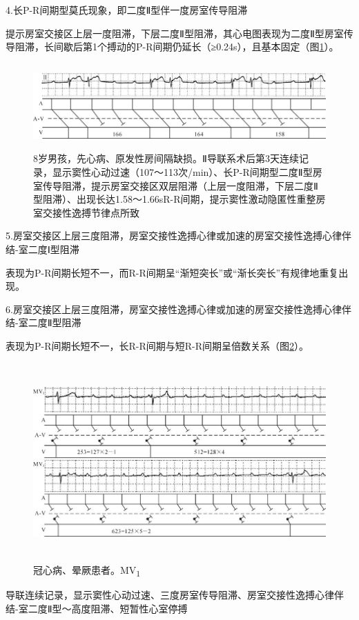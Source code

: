 4.长P-R间期型莫氏现象，即二度Ⅱ型伴一度房室传导阻滞

提示房室交接区上层一度阻滞，下层二度Ⅱ型阻滞，其心电图表现为二度Ⅱ型房室传导阻滞，长间歇后第1个搏动的P-R间期仍延长（≥0.24s），且基本固定（图\ref{fig24-5}）。

\begin{figure}[!htbp]
 \centering
 \includegraphics[width=5.76042in,height=1.29167in]{./images/Image00400.jpg}
 \captionsetup{justification=centering}
 \caption{8岁男孩，先心病、原发性房间隔缺损。Ⅱ导联系术后第3天连续记录，显示窦性心动过速（107～113次/min）、长P-R间期型二度Ⅱ型房室传导阻滞，提示房室交接区双层阻滞（上层一度阻滞，下层二度Ⅱ型阻滞）、出现长达1.58～1.66sR-R间期，提示窦性激动隐匿性重整房室交接性逸搏节律点所致}
 \label{fig24-5}
  \end{figure} 

5.房室交接区上层三度阻滞，房室交接性逸搏心律或加速的房室交接性逸搏心律伴结-室二度Ⅰ型阻滞

表现为P-R间期长短不一，而R-R间期呈“渐短突长”或“渐长突长”有规律地重复出现。

6.房室交接区上层三度阻滞，房室交接性逸搏心律或加速的房室交接性逸搏心律伴结-室二度Ⅱ型阻滞

表现为P-R间期长短不一，长R-R间期与短R-R间期呈倍数关系（图\ref{fig24-6}）。

\begin{figure}[!htbp]
 \centering
 \includegraphics[width=5.80208in,height=2.98958in]{./images/Image00401.jpg}
 \captionsetup{justification=centering}
 \caption{冠心病、晕厥患者。MV\textsubscript{1}}
 \label{fig24-6}
  \end{figure} 
导联连续记录，显示窦性心动过速、三度房室传导阻滞、房室交接性逸搏心律伴结-室二度Ⅱ型～高度阻滞、短暂性心室停搏

